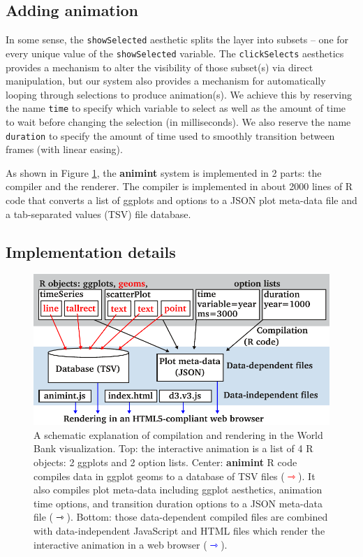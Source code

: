 \documentclass[12pt,]{article}
\theoremstyle{definition}
\theoremstyle{definition}
\theoremstyle{definition}
\theoremstyle{remark}
\begin{document}
\hypertarget{animation}{%
\subsection{Adding animation}\label{animation}}

In some sense, the \texttt{showSelected} aesthetic splits the layer into
subsets -- one for every unique value of the \texttt{showSelected}
variable. The \texttt{clickSelects} aesthetics provides a mechanism to
alter the visibility of those subset(s) via direct manipulation, but our
system also provides a mechanism for automatically looping through
selections to produce animation(s). We achieve this by reserving the
name \texttt{time} to specify which variable to select as well as the
amount of time to wait before changing the selection (in milliseconds).
We also reserve the name \texttt{duration} to specify the amount of time
used to smoothly transition between frames (with linear easing).

As shown in Figure \ref{fig:design}, the \textbf{animint} system is
implemented in 2 parts: the compiler and the renderer. The compiler is
implemented in about 2000 lines of R code that converts a list of
ggplots and options to a JSON plot meta-data file and a tab-separated
values (TSV) file database.

\hypertarget{implementation-details}{%
\subsection{Implementation details}\label{implementation-details}}

\begin{figure}
\centering
\includegraphics{images/figure-design.pdf}
\caption{\label{fig:design}A schematic explanation of compilation and
rendering in the World Bank visualization. Top: the interactive
animation is a list of 4 R objects: 2 ggplots and 2 option lists.
Center: \textbf{animint} R code compiles data in ggplot geoms to a
database of TSV files (\textcolor{red}{$\rightarrowtriangle$}). It also
compiles plot meta-data including ggplot aesthetics, animation time
options, and transition duration options to a JSON meta-data file
(\(\rightarrowtriangle\)). Bottom: those data-dependent compiled files
are combined with data-independent JavaScript and HTML files which
render the interactive animation in a web browser
(\textcolor{blue}{$\rightarrowtriangle$}).}
\end{figure}
\end{document}
